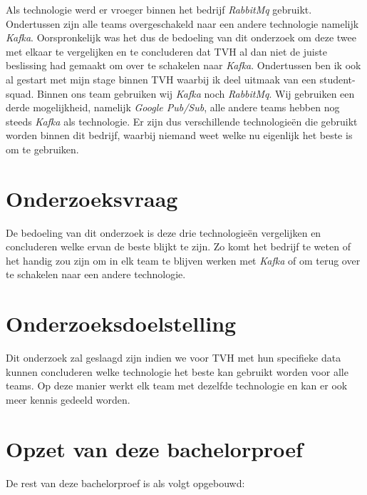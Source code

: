 Als technologie werd er vroeger binnen het bedrijf \emph{RabbitMq} gebruikt. Ondertussen zijn alle teams overgeschakeld naar een andere technologie namelijk \emph{Kafka}. Oorspronkelijk was het dus de bedoeling van dit onderzoek om deze twee met elkaar te vergelijken en te concluderen dat TVH al dan niet de juiste beslissing had gemaakt om over te schakelen naar \emph{Kafka}. Ondertussen ben ik ook al gestart met mijn stage binnen TVH waarbij ik deel uitmaak van een student-squad. Binnen ons team gebruiken wij \emph{Kafka} noch \emph{RabbitMq}. Wij gebruiken een derde mogelijkheid, namelijk \emph{Google Pub/Sub}, alle andere teams hebben nog steeds \emph{Kafka} als technologie. Er zijn dus verschillende technologieën die gebruikt worden binnen dit bedrijf, waarbij niemand weet welke nu eigenlijk het beste is om te gebruiken. 

\section{Onderzoeksvraag}
\label{sec:onderzoeksvraag}

De bedoeling van dit onderzoek is deze drie technologieën vergelijken en concluderen welke ervan de beste blijkt te zijn. Zo komt het bedrijf te weten of het handig zou zijn om in elk team te blijven werken met \emph{Kafka} of om terug over te schakelen naar een andere technologie. 

\section{Onderzoeksdoelstelling}
\label{sec:onderzoeksdoelstelling}

Dit onderzoek zal geslaagd zijn indien we voor TVH met hun specifieke data kunnen concluderen welke technologie het beste kan gebruikt worden voor alle teams. Op deze manier werkt elk team met dezelfde technologie en kan er ook meer kennis gedeeld worden.

\section{Opzet van deze bachelorproef}
\label{sec:opzet-bachelorproef}


De rest van deze bachelorproef is als volgt opgebouwd:

